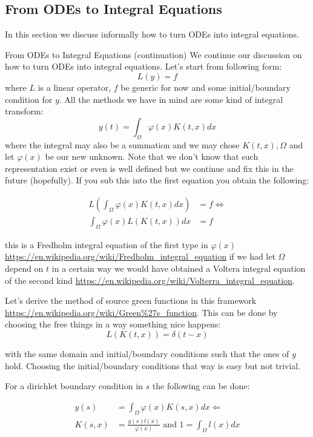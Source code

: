 \documentclass[a4paper,12pt]{article}
\begin{document}
\subsection{From ODEs to Integral Equations}
In this section we discuss informally how to turn ODEs into integral equations.

From ODEs to Integral Equations (continuation)
We continue our discussion on how to turn ODEs into integral equations.
Let's start from following form:
$$
    L(y)= f
$$
where $L$ is a linear operator, $f$ be generic for now and some initial/boundary condition
for $y$. All the methods we have in mind are some kind of integral transform:
$$
    y(t) = \int_{\Omega} \varphi(x) K(t,x)dx
$$
where the integral may also be a summation and we may chose $K(t,x), \Omega$ and let $\varphi(x)$ be our new unknown. Note that we don't know that such representation exist or even is well defined but we continue and fix this in the future (hopefully). If you sub this into the first equation you obtain the following:

\begin{align*}
    L \left(\int_{\Omega} \varphi(x) K(t,x)dx \right) & = f \Leftrightarrow \\
    \int_{\Omega} \varphi(x) L \left(K(t,x) \right)dx & = f
\end{align*}

this is a Fredholm integral equation of the first type in $\varphi(x)$
\url{https://en.wikipedia.org/wiki/Fredholm_integral_equation}
if we had
let $\Omega$ depend on $t$ in a certain way we would have obtained a Voltera integral
equation of the second kind
\url{https://en.wikipedia.org/wiki/Volterra_integral_equation}.

Let's derive the method of source green functions in this framework
\url{https://en.wikipedia.org/wiki/Green%27s_function}. 
This can be done by choosing the free things in a way something nice happens:
$$
    L \left(K(t,x) \right) = \delta(t-x)
$$

with the same  domain and initial/boundary conditions such that the ones of $y$ hold.
Choosing the initial/boundary conditions that way is easy but not trivial.

For a dirichlet boundary condition in $s$ the following can be done:

\begin{align*}
    y(s)   & = \int_{\Omega} \varphi(x) K(s,x)dx \Leftarrow                      \\
    K(s,x) & = \frac{y(s) l(x)}{\varphi(x)} \text{ and } 1 = \int_{\Omega}l(x)dx
\end{align*}
\end{document}
